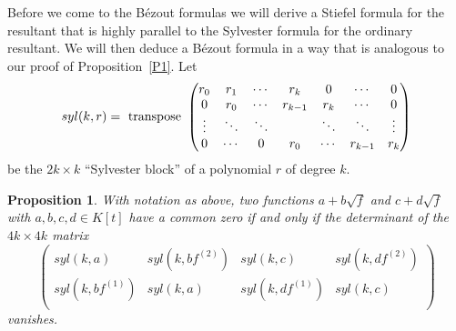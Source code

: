 \documentclass{jams-l}
\newtheorem{proposition}[theorem]{Proposition}
\theoremstyle{definition}
\theoremstyle{remark}
\begin{document}
Before we come to the  B\'ezout formulas we will derive a Stiefel
formula for the resultant that is highly parallel to the
Sylvester formula for the ordinary resultant. We will then
deduce a B\'ezout formula in a way that is analogous to our
proof of Proposition~\ref{P1}.
Let
\[
syl(k,r) = \hbox{ transpose } 
\begin{pmatrix} r_0 & r_1 & \ldots  & r_k & 0 & \ldots & 0 \\
          0 & r_0 & \ldots & r_{k-1} & r_k &\ldots & 0 \\
          \vdots&\ddots&\ddots& &\ddots &\ddots &\vdots \\
          0 & \ldots & 0 & r_0 & \ldots & r_{k-1} & r_k \\ \end{pmatrix}
\]
be the $2k\times k$  ``Sylvester block'' of a polynomial $r$ of
degree $k$.  

\begin{proposition}\label{Hyperelliptic Sylvester formula}
With notation as above, two functions
$a+b\sqrt f$ and $c+d\sqrt f$ with $a,b,c,d \in K[t]$ 
have a common zero if and only if the determinant of the $4k \times 4k$ matrix
\[ \begin{pmatrix}
        syl(k,a) & syl(k,bf^{(2)}) & syl(k,c) & syl(k,df^{(2)}) \\  
        syl(k,bf^{(1)}) & syl(k,a) & syl(k,df^{(1)}) & syl(k,c) \\ 
\end{pmatrix}
\]
vanishes. 
\end{proposition}
\end{document}
